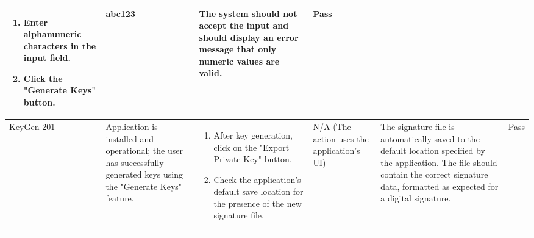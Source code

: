\documentclass[]{final_report}
\theoremstyle{definition}
\begin{document}
\begin{longtable}{|l|p{2.5cm}|p{2.5cm}|p{2.5cm}|p{2.5cm}|p{3cm}|}
\begin{enumerate}
  \item Enter alphanumeric characters in the input field.
  \item Click the "Generate Keys" button.
  \end{enumerate} & abc123 & The system should not accept the input and should display an error message that only numeric values are valid. & Pass \\
  \hline
  KeyGen-201 & Application is installed and operational; the user has successfully generated keys using the "Generate Keys" feature. & 
  \begin{enumerate}
  \item After key generation, click on the "Export Private Key" button.
  \item Check the application's default save location for the presence of the new signature file.
  \end{enumerate} & N/A (The action uses the application's UI) & The signature file is automatically saved to the default location specified by the application. The file should contain the correct signature data, formatted as expected for a digital signature. & Pass \\
  \hline
\end{longtable}
\end{document}
